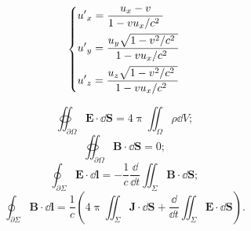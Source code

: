 \documentclass{article}
\begin{document}
\[\begin{dcases}
{{{{u}'}}_{x}}=\frac{{{u}_{x}}-v}{1-{v{{u}_{x}}}/{{{c}^{2}}}\;} \\ 
{{{{u}'}}_{y}}=\frac{{{u}_{y}}\sqrt{1-{{{v}^{2}}}/{{{c}^{2}}}\;}}{1-{v{{u}_{x}}}/{{{c}^{2}}}\;} \\ 
{{{{u}'}}_{z}}=\frac{{{u}_{z}}\sqrt{1-{{{v}^{2}}}/{{{c}^{2}}}\;}}{1-{v{{u}_{x}}}/{{{c}^{2}}}\;}  \\
\end{dcases}\]


\[\oiint_{\partial\Omega}\symbf{E}\cdot\dd{\symbf S}=4\uppi \iint_{\Omega}\rho\dd{V};\]
\[\oiint_{\partial\Omega}\symbf{B}\cdot\dd{\symbf S}=0;\]
\[\oint_{\partial\Sigma}\symbf E\cdot \dd{\symbf{l}}=-\frac{1}{c}\frac{\dd}{\dd t}\iint_{\Sigma}\symbf B \cdot \dd{\symbf{S}};\]
\[\oint_{\partial\Sigma}\symbf B\cdot \dd{\symbf{l}}=\frac{1}{c}\left(4\uppi\iint_{\Sigma}\symbf J\cdot \dd{\symbf S}+\frac{\dd}{\dd t}\iint_{\Sigma}\symbf E \cdot \dd{\symbf{S}}\right).\]
\end{document}
